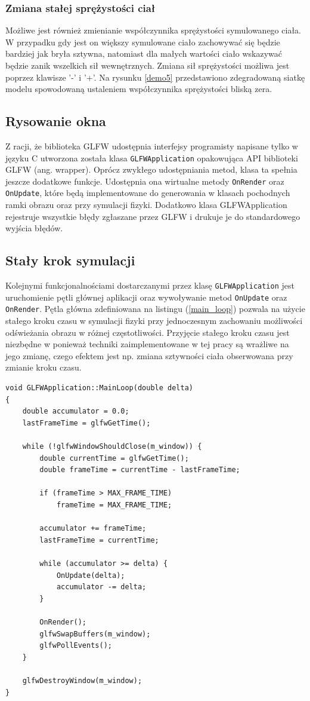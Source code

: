 \subsubsection{Zmiana stałej sprężystości ciał}
Możliwe jest również zmienianie współczynnika sprężystości symulowanego ciała. W
przypadku gdy jest on większy symulowane ciało zachowywać się będzie bardziej
jak bryła sztywna, natomiast dla małych wartości ciało wskazywać będzie zanik
wszelkich sił wewnętrznych. Zmiana sił sprężystości możliwa jest poprzez
klawisze '-' i '+'. Na rysunku \ref{demo5} przedstawiono zdegradowaną siatkę
modelu spowodowaną ustaleniem współczynnika sprężystości bliską zera.

\subsection{Rysowanie okna}
Z racji, że biblioteka GLFW udostępnia interfejsy programisty napisane tylko w
języku C utworzona została klasa \texttt{GLFWApplication} opakowująca API
biblioteki GLFW (ang. wrapper). Oprócz zwykłego udostępniania metod, klasa ta
spełnia jeszcze dodatkowe funkcje. Udostępnia ona wirtualne metody
\texttt{OnRender} oraz \texttt{OnUpdate}, które będą implementowane do
generowania w klasach pochodnych ramki obrazu oraz przy symulacji fizyki. Dodatkowo klasa
GLFWApplication rejestruje wszystkie błędy zgłaszane przez GLFW i drukuje je do
standardowego wyjścia błędów.

\subsection{Stały krok symulacji}
Kolejnymi funkcjonalnościami dostarczanymi przez klasę \texttt{GLFWApplication} jest
uruchomienie pętli głównej aplikacji oraz wywoływanie metod \texttt{OnUpdate} oraz \texttt{OnRender}.
Pętla główna zdefiniowana na listingu (\ref{main_loop})
pozwala na użycie stałego kroku czasu w symulacji fizyki przy jednoczesnym
zachowaniu możliwości odświeżania obrazu w różnej częstotliwości. Przyjęcie
stałego kroku czasu jest niezbędne w ponieważ
techniki zaimplementowane w tej pracy są wrażliwe na jego zmianę, czego efektem jest
np. zmiana sztywności ciała obserwowana przy zmianie kroku czasu.

\begin{lstlisting}[caption=Pętla główna, label=main_loop]
void GLFWApplication::MainLoop(double delta)
{
	double accumulator = 0.0;
	lastFrameTime = glfwGetTime();

	while (!glfwWindowShouldClose(m_window)) {
		double currentTime = glfwGetTime();
		double frameTime = currentTime - lastFrameTime;

		if (frameTime > MAX_FRAME_TIME)
			frameTime = MAX_FRAME_TIME;

		accumulator += frameTime;
		lastFrameTime = currentTime;

		while (accumulator >= delta) {
			OnUpdate(delta);
			accumulator -= delta;
		}

		OnRender();
		glfwSwapBuffers(m_window);
		glfwPollEvents();
	}

	glfwDestroyWindow(m_window);
}
\end{lstlisting}

